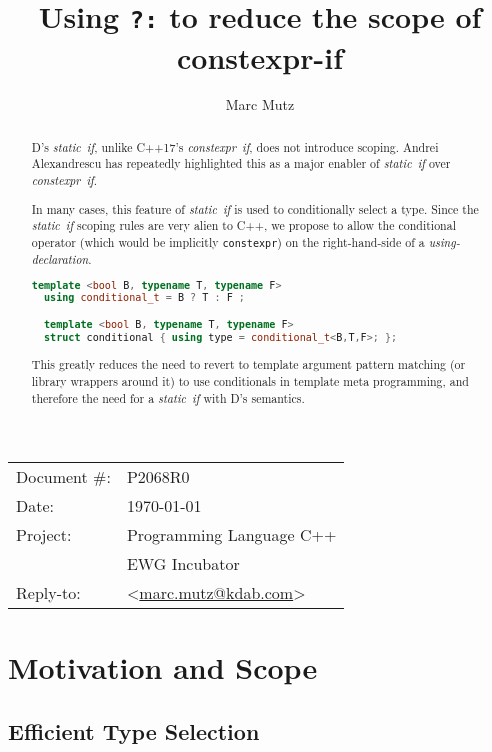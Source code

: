 \documentclass[11pt]{article}
\date{}
\title{Using \texttt{?:} to reduce the scope of constexpr-if}
\makeatletter
\newcommand{\emailaddress}{marc.mutz@kdab.com}
\newcommand{\email}{\href{mailto:\emailaddress}{\emailaddress}}
\makeatother
\begin{document}
\maketitle\vspace{-2cm}

\begin{tabular}{ll}
  Document \#:&P2068R0\\
  Date:       &\today\\
  Project:    &Programming Language C++\\
              &EWG Incubator\\
  Reply-to:   &\author{Marc Mutz} \textless\email\textgreater
\end{tabular}
\vspace{1cm}
\begin{abstract}
  D's \emph{static~if}, unlike C++17's \emph{constexpr~if}, does not
  introduce scoping. Andrei Alexandrescu has repeatedly highlighted
  this as a major enabler of \emph{static~if} over \emph{constexpr~if}.

  In many cases, this feature of \emph{static~if} is used to
  conditionally select a type. Since the \emph{static~if} scoping
  rules are very alien to C++, we propose to allow the conditional
  operator (which would be implicitly \texttt{constexpr}) on the
  right-hand-side of a \emph{using-declaration}.

\begin{lstlisting}[language=c++]
  template <bool B, typename T, typename F>
  using conditional_t = B ? T : F ;

  template <bool B, typename T, typename F>
  struct conditional { using type = conditional_t<B,T,F>; };
\end{lstlisting}

This greatly reduces the need to revert to template argument pattern
matching (or library wrappers around it) to use conditionals in
template meta programming, and therefore the need for a
\emph{static~if} with D's semantics.
\end{abstract}



\section{Motivation and Scope}

\subsection{Efficient Type Selection}
\end{document}
